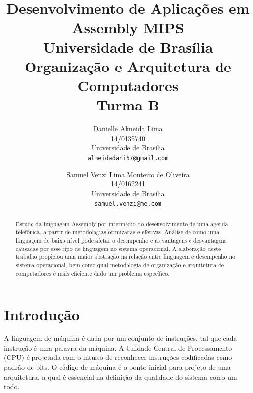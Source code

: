 \documentclass[10pt,twocolumn,letterpaper]{article}
\begin{document}
\title{Desenvolvimento de Aplicações em Assembly MIPS \\
	Universidade de Brasília\\
  \large Organização e Arquitetura de Computadores\\
  Turma B}
\author{Danielle Almeida Lima\\
14/0135740\\
Universidade de Brasília\\
{\tt\small almeidadani67@gmail.com}
\and
Samuel Venzi Lima Monteiro de Oliveira\\
14/0162241\\
Universidade de Brasília\\
{\tt\small samuel.venzi@me.com}
}

\maketitle

\begin{abstract}
   Estudo da linguagem Assembly por intermédio do desenvolvimento de uma
   agenda telefônica, a partir de metodologias otimizadas e efetivas.
   Análise de como uma linguagem de baixo nível pode afetar o desempenho
   e as vantagens e desvantagens causadas por esse tipo de linguagem no
   sistema operacional. A elaboração deste trabalho propiciou uma maior
   abstração na relação entre linguagem e desempenho no sistema
   operacional, bem como qual metodologia de organização e arquitetura
   de computadores é mais eficiente dado um problema específico.
\end{abstract}

\section{Introdução}

A linguagem de máquina é dada por um conjunto de instruções, tal
que cada instrução é uma palavra da máquina. A Unidade Central de Processamento
(CPU) é projetada com o intuito de reconhecer instruções codificadas como padrão
de bits. O código de máquina é o ponto inicial para projeto de uma arquitetura, 
a qual é essencial na definição da qualidade do sistema como um todo. 
\end{document}
